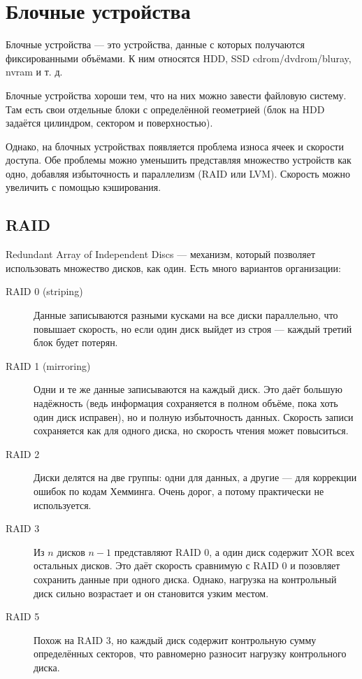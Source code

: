 \documentclass[main]{subfiles}
\begin{document}
\chapter{Блочные устройства}
Блочные устройства --- это устройства, данные с которых получаются
фиксированными объёмами. К ним относятся HDD, SSD cdrom/dvdrom/bluray,
nvram и т. д.

Блочные устройства хороши тем, что на них можно завести файловую систему.
Там есть свои отдельные блоки с определённой геометрией (блок на HDD задаётся
цилиндром, сектором и поверхностью).

Однако, на блочных устройствах появляется проблема износа ячеек и скорости
доступа. Обе проблемы можно уменьшить представляя множество устройств как
одно, добавляя избыточность и параллелизм (RAID или LVM). Скорость можно
увеличить с помощью кэширования.

\section{RAID}
Redundant Array of Independent Discs --- механизм, который позволяет
использовать множество дисков, как один. Есть много вариантов организации:

\begin{description}
\item[RAID 0 (striping)] Данные записываются разными кусками на все диски
параллельно, что повышает скорость, но если один диск выйдет из строя ---
каждый третий блок будет потерян.
\item[RAID 1 (mirroring)] Одни и те же данные записываются на каждый диск.
Это даёт большую надёжность (ведь информация сохраняется в полном объёме,
пока хоть один диск исправен), но и полную избыточность данных.
Скорость записи сохраняется как для одного диска, но скорость чтения
может повыситься.
\item[RAID 2] Диски делятся на две группы: одни для данных, а другие ---
для коррекции ошибок по кодам Хемминга. Очень дорог, а потому практически
не используется.
\item[RAID 3] Из $n$ дисков $n - 1$ представляют RAID 0, а один диск
содержит XOR всех остальных дисков. Это даёт скорость сравнимую с RAID 0
и позовляет сохранить данные при одного диска. Однако, нагрузка на
контрольный диск сильно возрастает и он становится узким местом.
\item[RAID 5] Похож на RAID 3, но каждый диск содержит контрольную сумму
определённых секторов, что равномерно разносит нагрузку контрольного диска.
\end{description}
\end{document}

